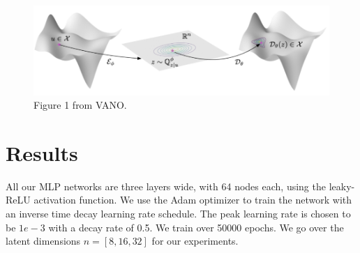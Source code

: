 \documentclass[11pt, fullpage,letterpaper]{article}
\begin{document}
\begin{figure}
    \centering
    \includegraphics[width=0.5\linewidth]{fig.png}
    \caption{Figure 1 from VANO.}
    \label{fig:vano}
\end{figure}

\section{Results}
All our MLP networks are three layers wide, with 64 nodes each, using the leaky-ReLU activation function. We use the Adam optimizer to train the network with an inverse time decay learning rate schedule. The peak learning rate is chosen to be $1e-3$ with a decay rate of 0.5. We train over 50000 epochs. We go over the latent dimensions $n = [8, 16, 32]$ for our experiments.
\end{document}
